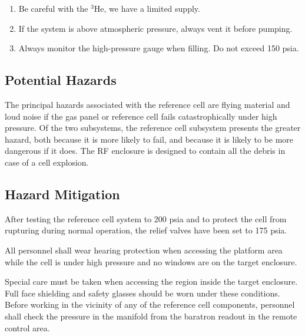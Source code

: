 \begin{enumerate}

\item Be careful with the $^3$He, we have a limited supply.

\item If the system is above atmospheric pressure, always vent it
before pumping.  

\item Always monitor the high-pressure gauge when filling. Do not  exceed 150 psia.

\end{enumerate}

\begin{safetyen}{10}{5}

\subsection{Potential Hazards}

The principal hazards associated with the reference cell are
flying material and loud noise if the gas panel or reference cell
fails catastrophically under high pressure.  Of the two subsystems,
the reference cell subsystem presents the greater hazard, both because
it is more likely to fail, and because it is likely to be more
dangerous if it does.  The RF enclosure is designed to contain all the debris
in case of a cell explosion.


\subsection{Hazard Mitigation }

After testing the reference cell system to 200 psia and to
protect the cell
from rupturing during normal operation,  the relief valves
 have been set to 175 psia.  


All personnel shall wear hearing protection when accessing the
 platform area while the cell is under high pressure and no windows are 
on the target enclosure.  

Special care must be taken when accessing the region inside
the target enclosure.  Full face shielding and safety glasses
 should be
worn under these
conditions.  Before working in the vicinity of any of the reference cell
components, personnel
shall check the pressure in the manifold from the baratron readout in
the
remote control area.



\end{safetyen}
